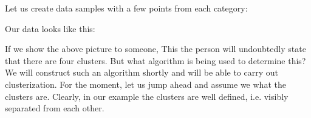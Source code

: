 \documentclass[a4paper,12pt,polish]{jupyterBook}
\begin{document}
\sphinxAtStartPar
Let us create data samples with a few points from each category:
\begin{sphinxVerbatimInput}

\begin{sphinxVerbatim}[commandchars=\\\{\}]
\PYG{p}{[}    \PYG{p}{]}
\PYG{p}{[}    \PYG{p}{]}
\PYG{p}{[}    \PYG{p}{]}
\PYG{p}{[}    \PYG{p}{]}
\end{sphinxVerbatim}
\end{sphinxVerbatimInput}

\sphinxAtStartPar
Our data looks like this:
\begin{sphinxVerbatimOutput}

\noindent{}
\end{sphinxVerbatimOutput}

\sphinxAtStartPar
If we show the above picture to someone, This the person will undoubtedly state that there are four clusters. But what algorithm is being used to determine this? We will construct such an algorithm shortly and will be able to carry out clusterization. For the moment, let us jump ahead and assume we  what the clusters are. Clearly, in our example the clusters are well defined, i.e. visibly separated from each other.
\end{document}
